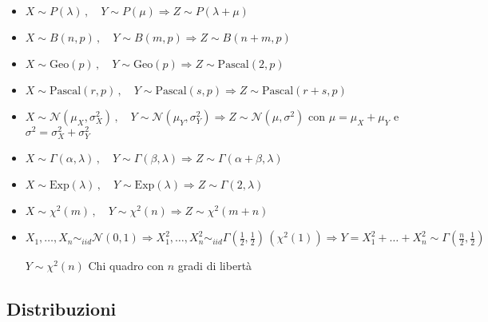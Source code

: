 \documentclass[openany]{book} %
\begin{document}
\begin{itemize}

\item $X\sim P(\lambda)\,,\quad Y\sim P(\mu)\Rightarrow Z\sim P(\lambda + \mu)$

\item $X\sim B(n,p)\,,\quad Y\sim B(m,p)\Rightarrow Z\sim B(n+m,p)$

\item $X\sim \text{Geo}(p)\,,\quad Y\sim \text{Geo}(p)\Rightarrow Z\sim \text{Pascal}(2,p)$

\item $X\sim \text{Pascal}(r,p)\,,\quad Y\sim \text{Pascal}(s,p)\Rightarrow Z\sim \text{Pascal}(r+s,p)$

\item $X\sim \mathcal{N}(\mu_X,\sigma_X^2)\,,\quad Y\sim \mathcal{N}(\mu_Y,\sigma_Y^2)\Rightarrow Z\sim \mathcal{N}(\mu,\sigma^2)$ con $\mu=\mu_X+\mu_Y$ e $\sigma^2=\sigma_X^2+\sigma_Y^2$

\item $X\sim \Gamma(\alpha,\lambda)\,,\quad Y\sim \Gamma(\beta,\lambda)\Rightarrow Z\sim \Gamma(\alpha+\beta,\lambda)$

\item $X\sim \text{Exp}(\lambda)\,,\quad Y\sim \text{Exp}(\lambda)\Rightarrow Z\sim \Gamma(2,\lambda)$

\item $X\sim\chi^2(m)\,,\quad Y\sim\chi^2(n)\Rightarrow Z\sim\chi^2(m+n)$

\item $X_1,\dots, X_n \sim_{iid} \mathcal{N}(0,1)\Rightarrow X_1^2,\dots, X_n^2 \sim_{iid}\Gamma(\frac{1}{2},\frac{1}{2})\,(\chi^2(1))\Rightarrow Y=X_1^2+\dots+X_n^2\sim\Gamma(\frac{n}{2},\frac{1}{2})$ 

$Y\sim\chi^2(n)$ Chi quadro con $n$ gradi di libertà

\end{itemize}

\subsection*{Distribuzioni}
\end{document}
